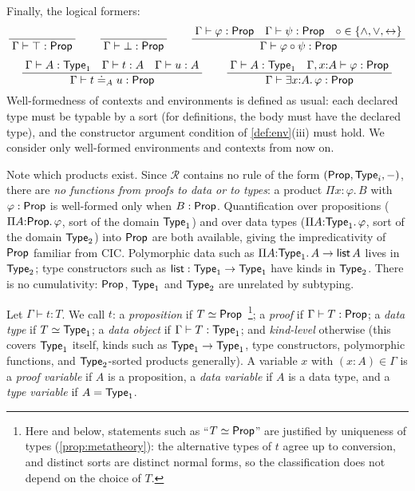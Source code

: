 \begin{definition}[Typing]
Finally, the logical formers:
\begin{gather*}
\dfrac{\;\;}{\;\Gamma \vdash \top : \mathsf{Prop}\;} \qquad
\dfrac{\;\;}{\;\Gamma \vdash \bot : \mathsf{Prop}\;} \qquad
\dfrac{\;\Gamma \vdash \varphi : \mathsf{Prop} \quad \Gamma \vdash \psi : \mathsf{Prop} \quad \circ \in \{\wedge, \vee, \leftrightarrow\}\;}{\;\Gamma \vdash \varphi \circ \psi : \mathsf{Prop}\;}
\\[1ex]
\dfrac{\;\Gamma \vdash A : \mathsf{Type}_1 \quad \Gamma \vdash t : A \quad \Gamma \vdash u : A\;}{\;\Gamma \vdash t \doteq_A u : \mathsf{Prop}\;}
\qquad
\dfrac{\;\Gamma \vdash A : \mathsf{Type}_1 \quad \Gamma, x{:}A \vdash \varphi : \mathsf{Prop}\;}{\;\Gamma \vdash \exists x{:}A.\,\varphi : \mathsf{Prop}\;}
\end{gather*}
Well-formedness of contexts and environments is defined as usual: each
declared type must be typable by a sort (for definitions, the body
must have the declared type), and the constructor argument condition
of \cref{def:env}(iii) must hold.  We consider only well-formed
environments and contexts from now on.
\end{definition}

Note which products exist.  Since $\mathcal{R}$ contains no rule of
the form $(\mathsf{Prop}, \mathsf{Type}_i, -)$, there are \emph{no functions
from proofs to data or to types}: a product $\Pi x{:}\varphi.\,B$ with
$\varphi : \mathsf{Prop}$ is well-formed only when $B : \mathsf{Prop}$.
Quantification over propositions ($\Pi A{:}\mathsf{Prop}.\,\varphi$, sort of
the domain $\mathsf{Type}_1$) and over data types ($\Pi
A{:}\mathsf{Type}_1.\,\varphi$, sort of the domain $\mathsf{Type}_2$) into $\mathsf{Prop}$
are both available, giving the impredicativity of $\mathsf{Prop}$ familiar
from CIC.  Polymorphic data such as $\Pi A{:}\mathsf{Type}_1.\,A \to
\mathsf{list}\,A$ lives in $\mathsf{Type}_2$; type constructors such as
$\mathsf{list} : \mathsf{Type}_1 \to \mathsf{Type}_1$ have kinds in $\mathsf{Type}_2$.  There
is no cumulativity: $\mathsf{Prop}$, $\mathsf{Type}_1$ and $\mathsf{Type}_2$ are unrelated
by subtyping.

\begin{definition}[Classification]
\label{def:classification}
Let $\Gamma \vdash t : T$.  We call $t$:
a \emph{proposition} if $T \simeq \mathsf{Prop}$\,%
\footnote{Here and below, statements such as ``$T \simeq \mathsf{Prop}$'' are
justified by uniqueness of types (\cref{prop:metatheory}): the
alternative types of $t$ agree up to conversion, and distinct sorts
are distinct normal forms, so the classification does not depend on
the choice of $T$.};
a \emph{proof} if $\Gamma \vdash T : \mathsf{Prop}$;
a \emph{data type} if $T \simeq \mathsf{Type}_1$;
a \emph{data object} if $\Gamma \vdash T : \mathsf{Type}_1$;
and \emph{kind-level} otherwise (this covers $\mathsf{Type}_1$ itself, kinds
such as $\mathsf{Type}_1 \to \mathsf{Type}_1$, type constructors, polymorphic
functions, and $\mathsf{Type}_2$-sorted products generally).
A variable $x$ with $(x{:}A) \in \Gamma$ is a \emph{proof variable}
if $A$ is a proposition, a \emph{data variable} if $A$ is a data
type, and a \emph{type variable} if $A = \mathsf{Type}_1$.
\end{definition}

